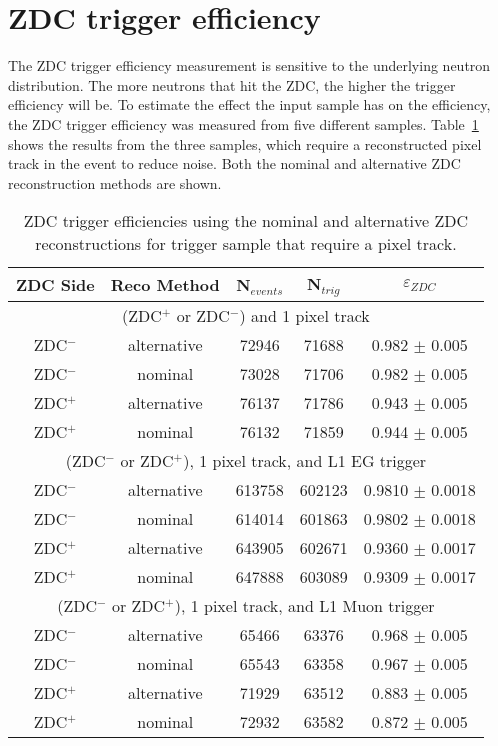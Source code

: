   \section{ZDC trigger efficiency}
    The ZDC trigger efficiency measurement is sensitive to the underlying 
      neutron distribution.
    The more neutrons that hit the ZDC, the higher the trigger efficiency 
      will be.
    To estimate the effect the input sample has on the efficiency, the ZDC 
      trigger efficiency was measured from five different samples.
    Table~\ref{tab:zdcEfficiencySys} shows the results from the 
      three samples, which require a reconstructed pixel track in the event to 
      reduce noise. 
    Both the nominal and alternative ZDC reconstruction methods are shown.
    \begin{table}
      \centering
      \begin{tabular}{|c|c|c|c|c|}
        \hline ZDC Side & Reco Method & N$_{events}$ & N$_{trig}$ & $\varepsilon_{ZDC}$ \\ \hline
         \multicolumn{5}{|c|}{(ZDC$^{+}$ or ZDC$^{-}$) and 1 pixel track} \\ \hline 
         ZDC$^{-}$ & alternative & 72946  & 71688 & 0.982 $\pm$ 0.005 \\ \hline
         ZDC$^{-}$ & nominal & 73028  & 71706  & 0.982  $\pm$ 0.005  \\ \hline
         ZDC$^{+}$ & alternative & 76137  & 71786  & 0.943  $\pm$ 0.005  \\ \hline
         ZDC$^{+}$ & nominal & 76132  & 71859  & 0.944  $\pm$ 0.005  \\ \hline
         \multicolumn{5}{|c|}{(ZDC$^{-}$ or ZDC$^{+}$), 1 pixel track, and L1 EG trigger } \\ \hline 
         ZDC$^{-}$ & alternative & 613758  & 602123  & 0.9810 $\pm$ 0.0018 \\ \hline
         ZDC$^{-}$ & nominal & 614014  & 601863  & 0.9802 $\pm$ 0.0018 \\ \hline
         ZDC$^{+}$ & alternative & 643905  & 602671  & 0.9360  $\pm$ 0.0017 \\ \hline
         ZDC$^{+}$ & nominal & 647888  & 603089  & 0.9309  $\pm$ 0.0017 \\ \hline
         \multicolumn{5}{|c|}{(ZDC$^{-}$ or ZDC$^{+}$), 1 pixel track, and L1 Muon trigger} \\ \hline 
         ZDC$^{-}$ & alternative & 65466  & 63376  & 0.968 $\pm$ 0.005  \\ \hline
         ZDC$^{-}$ & nominal & 65543  & 63358  & 0.967 $\pm$ 0.005 \\ \hline
         ZDC$^{+}$ & alternative & 71929  & 63512  & 0.883  $\pm$ 0.005 \\ \hline
         ZDC$^{+}$ & nominal & 72932  & 63582  & 0.872  $\pm$ 0.005 \\ \hline
       \end{tabular}
      \caption{ZDC trigger efficiencies using  the nominal and alternative 
        ZDC reconstructions for trigger sample that require a pixel track.}
      \label{tab:zdcEfficiencySys}
    \end{table}

